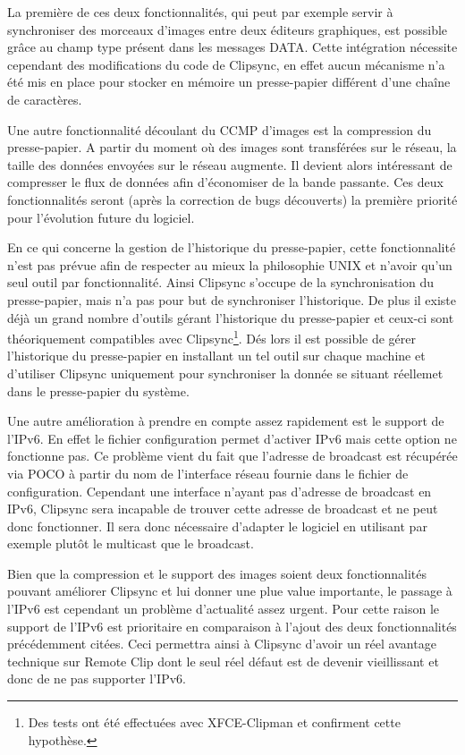 La première de ces deux fonctionnalités, qui peut par exemple servir à
synchroniser des morceaux d'images entre deux éditeurs graphiques, est
possible grâce au champ type présent dans les messages DATA. Cette intégration
nécessite cependant des modifications du code de Clipsync, en effet aucun
mécanisme n'a été mis en place pour stocker en mémoire un presse-papier
différent d'une chaîne de caractères.

Une autre fonctionnalité découlant du CCMP d'images est la compression du
presse-papier. A partir du moment où des images sont transférées sur le
réseau, la taille des données envoyées sur le réseau augmente. Il devient
alors intéressant de compresser le flux de données afin d'économiser de la
bande passante. Ces deux fonctionnalités seront (après la correction
de bugs découverts) la première priorité pour l'évolution future du logiciel.

En ce qui concerne la gestion de l'historique du presse-papier, cette
fonctionnalité n'est pas prévue afin de respecter au mieux la philosophie
UNIX et n'avoir qu'un seul outil par fonctionnalité. Ainsi Clipsync
s'occupe de la synchronisation du presse-papier, mais n'a pas pour but de
synchroniser l'historique. De plus il existe déjà un grand nombre d'outils
gérant l'historique du presse-papier et ceux-ci sont théoriquement compatibles
avec Clipsync\footnote{Des tests ont été effectuées avec XFCE-Clipman et
confirment cette hypothèse.}. Dés lors il est possible de gérer l'historique
du presse-papier en installant un tel outil sur chaque machine et d'utiliser
Clipsync uniquement pour synchroniser la donnée se situant réellemet dans
le presse-papier du système.

Une autre amélioration à prendre en compte assez rapidement est le support
de l'IPv6. En effet le fichier configuration permet d'activer IPv6 mais
cette option ne fonctionne pas. Ce problème vient du fait que l'adresse
de broadcast est récupérée via POCO à partir du nom de l'interface réseau
fournie dans le fichier de configuration. Cependant une interface n'ayant
pas d'adresse de broadcast en IPv6, Clipsync sera incapable de trouver
cette adresse de broadcast et ne peut donc fonctionner. Il sera donc nécessaire
d'adapter le logiciel en utilisant par exemple plutôt le multicast que le
broadcast.

Bien que la compression et le support des images soient deux fonctionnalités
pouvant améliorer Clipsync et lui donner une plue value importante, le passage
à l'IPv6 est cependant un problème d'actualité assez urgent. Pour cette
raison le support de l'IPv6 est prioritaire en comparaison à l'ajout des
deux fonctionnalités précédemment citées. Ceci permettra ainsi à Clipsync
d'avoir un réel avantage technique sur Remote Clip dont le seul réel défaut
est de devenir vieillissant et donc de ne pas supporter l'IPv6.

